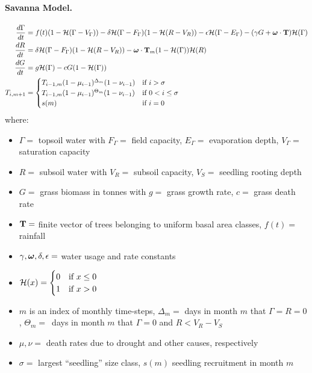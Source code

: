 \documentclass[11pt]{article}
\begin{document}
\paragraph{Savanna Model.}
\begin{align}
\frac{d\Gamma}{dt} &= f(t)(1-\mathcal{H}(\Gamma - V_\Gamma)) - \delta\mathcal{H}(\Gamma-F_\Gamma)(1-\mathcal{H}(R-V_R)) - \epsilon\mathcal{H}(\Gamma-E_\Gamma)-(\gamma G+\boldsymbol\omega\cdot\mathbf{T})\mathcal{H}(\Gamma)\nonumber\\
\frac{dR}{dt} &= \delta \mathcal{H}(\Gamma-F_\Gamma)(1-\mathcal{H}(R-V_R)) - \boldsymbol\omega\cdot\mathbf{T}_m(1-\mathcal{H}( \Gamma))\mathcal{H}(R)\nonumber\\
\frac{dG}{dt} &= g\mathcal{H}(\Gamma)-cG(1-\mathcal{H}(\Gamma))\label{eqn:GamRGT}\\
T_{i,m+1} &=
\begin{cases}
T_{i-1,m}(1 - \mu_{i-1})^{\Delta_m}(1-\nu_{i-1}) &\mbox{if } i > \sigma\\
T_{i-1,m}(1 - \mu_{i-1})^{\Theta_m}(1-\nu_{i-1}) &\mbox{if } 0<i\leq\sigma\\
s(m) &\mbox{if } i=0
\end{cases}\nonumber
\end{align}
where:
\begin{itemize}
\item $\Gamma = $ topsoil water with $F_\Gamma = $ field capacity, $E_\Gamma = $ evaporation depth, $V_\Gamma = $ saturation capacity
\item $R = $ subsoil water with $V_R = $ subsoil capacity, $V_S = $ seedling rooting depth
\item $G = $ grass biomass in tonnes with $g = $ grass growth rate, $c = $ grass death rate
\item $\mathbf{T} = $ finite vector of trees belonging to uniform basal area classes, $f(t) = $ rainfall
\item $\gamma,\boldsymbol\omega,\delta,\epsilon = $ water usage and rate constants
\item $\mathcal{H}(x) =
\begin{cases}
0 &\mbox{if } x\leq 0\\
1 &\mbox{if } x>0
\end{cases}$
\item $m$ is an index of monthly time-steps, $\Delta_m = $ days in month $m$ that $\Gamma=R=0$, $\Theta_m = $~days in month $m$ that $\Gamma=0$ and $R<V_R-V_S$
\item $\mu,\nu = $ death rates due to drought and other causes, respectively
\item $\sigma = $ largest ``seedling'' size class, $s(m)$ seedling recruitment in month $m$
\end{itemize}
\end{document}
